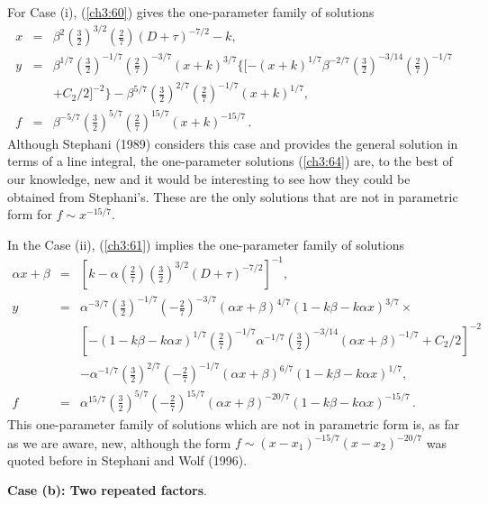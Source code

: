 For Case (i), (\ref{ch3:60}) gives the one-parameter family of solutions
\begin{equation}\label{ch3:64}
\begin{array}{lll}  
x&=&\beta^2(\frac32)^{3/2}\left(\frac27\right)(D+\tau)^{-7/2}-k,\\
y&=&\beta^{1/7}(\frac32)^{-1/7}(\frac27)^{-3/7}(x+k)^{3/7}\{
[-(x+k)^{1/7}\beta^{-2/7}(\frac32)^{-3/14}(\frac27)^{-1/7}\\
& & +C_2/2]^{-2}\}
-\beta^{5/7}(\frac32)^{2/7}(\frac27)^{-1/7}(x+k)^{1/7},\\
f&=&\beta^{-5/7}(\frac32)^{5/7}(\frac27)^{15/7}(x+k)^{-15/7}\,.
\end{array}
\end{equation}
Although Stephani (1989) considers this case and provides the general solution in terms of 
a line integral, the one-parameter solutions (\ref{ch3:64}) are, to the best of our knowledge,
new and it would be interesting to see how they could 
be obtained from Stephani's. These are the only solutions that are not in 
parametric form for $f\sim x^{-15/7}$.

In the Case (ii), (\ref{ch3:61}) implies the one-parameter family of solutions
\begin{equation}\label{ch3:65}
\begin{array}{lll} \alpha x+\beta &= & [k-\alpha(\frac27)(\frac32)^{3/2}(D+\tau)^{-7/2}]^{-1},\\
y&=&\alpha^{-3/7}(\frac32)^{-1/7}(-\frac27)^{-3/7}(\alpha x+\beta)^{4/7}(1-k\beta-k\alpha x)^{3/7}\times\\
&&[-(1-k\beta-k\alpha x)^{1/7}(\frac27)^{-1/7}\alpha^{-1/7}(\frac32)^{-3/14}(\alpha x+\beta)^{-1/7}+C_2/2]^{-2}\\
&& -\alpha^{-1/7}(\frac32)^{2/7}(-\frac27)^{-1/7}(\alpha x+\beta)^{6/7}(1-k\beta-k\alpha x)^{1/7},\\
f&=&\alpha^{15/7}(\frac32)^{5/7}(-\frac27)^{15/7}(\alpha x+\beta)^{-20/7}(1-k\beta-k\alpha x)^{-15/7}\,.
\end{array}
\end{equation}
This one-parameter family of solutions which are not in parametric form
is, as far as we are aware, new, although the form
$f\sim (x-x_1)^{-15/7}(x-x_2)^{-20/7}$ was quoted before in
Stephani and Wolf (1996).

{\bf Case (b): Two repeated factors}.

